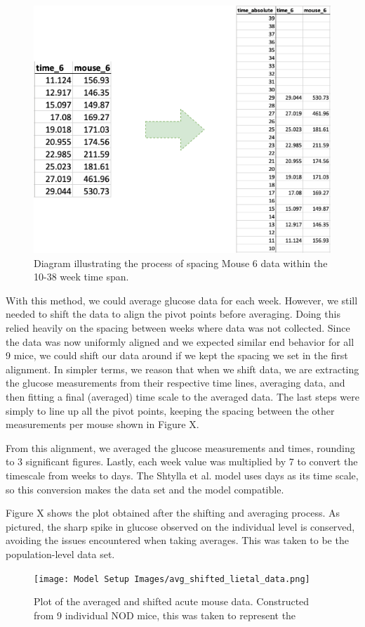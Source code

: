 \documentclass{article}
\begin{document}
\begin{figure}[H]
    \centering
    \includegraphics[width=15cm]{MCMC_figs/lietal_avg_diagram.png}
    \caption{Diagram illustrating the process of spacing Mouse 6 data within the 10-38 week time span.}
\end{figure}
With this method, we could average glucose data for each week. However, we still needed to shift the data to align the pivot points before averaging. Doing this relied heavily on the spacing between weeks where data was not collected. Since the data was now uniformly aligned and we expected similar end behavior for all 9 mice, we could shift our data around if we kept the spacing we set in the first alignment. In simpler terms, we reason that when we shift data, we are extracting the glucose measurements from their respective time lines, averaging data, and then fitting a final (averaged) time scale to the averaged data. The last steps were simply to line up all the pivot points, keeping the spacing between the other measurements per mouse shown in Figure X. 
\par From this alignment, we averaged the glucose measurements and times, rounding to 3 significant figures. Lastly, each week value was multiplied by 7 to convert the timescale from weeks to days. The Shtylla et al. model uses days as its time scale, so this conversion makes the data set and the model compatible.
\par Figure X shows the plot obtained after the shifting and averaging process. As pictured, the sharp spike in glucose observed on the individual level is conserved, avoiding the issues encountered when taking averages. This was taken to be the population-level data set. 
\begin{figure}[H]
    \centering
    \texttt{[image: Model Setup Images/avg\_shifted\_lietal\_data.png]}
    \caption{Plot of the averaged and shifted acute mouse data. Constructed from 9 individual NOD mice, this was taken to represent the }
\end{figure}
\end{document}
